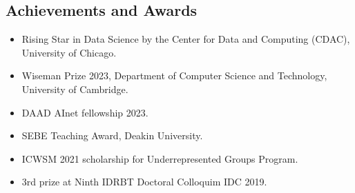 \documentclass[margin, centered]{res}
\begin{document}
\begin{resume}
\section{Achievements and Awards}
\begin{itemize}[leftmargin=*]
 \item Rising Star in Data Science by the Center for Data and Computing (CDAC), University of Chicago.
 \item Wiseman Prize 2023, Department of Computer Science and Technology, University of Cambridge.
 \item DAAD AInet fellowship 2023.
 \item SEBE Teaching Award, Deakin University.
 \item ICWSM 2021 scholarship for Underrepresented Groups Program.
 \item 3rd prize at Ninth IDRBT Doctoral Colloquim IDC 2019.
\end{itemize}

\end{resume}
\end{document}
